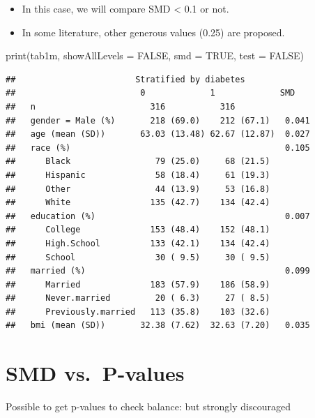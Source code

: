 \documentclass[
]{book}
\newenvironment{Shaded}{\begin{snugshade}}{\end{snugshade}}
\newcommand{\AttributeTok}[1]{\textcolor[rgb]{0.77,0.63,0.00}{#1}}
\newcommand{\ConstantTok}[1]{\textcolor[rgb]{0.00,0.00,0.00}{#1}}
\newcommand{\FunctionTok}[1]{\textcolor[rgb]{0.00,0.00,0.00}{#1}}
\newcommand{\NormalTok}[1]{#1}
\providecommand{\tightlist}{%
  \setlength{\itemsep}{0pt}\setlength{\parskip}{0pt}}
\begin{document}
\begin{itemize}
\tightlist
\item
  In this case, we will compare SMD \textless{} 0.1 or not.
\item
  In some literature, other generous values (0.25) are proposed. \citep{austin2011introduction}
\end{itemize}

\begin{Shaded}
\begin{Highlighting}[]
\FunctionTok{print}\NormalTok{(tab1m, }\AttributeTok{showAllLevels =} \ConstantTok{FALSE}\NormalTok{, }\AttributeTok{smd =} \ConstantTok{TRUE}\NormalTok{, }\AttributeTok{test =} \ConstantTok{FALSE}\NormalTok{) }
\end{Highlighting}
\end{Shaded}

\begin{verbatim}
##                        Stratified by diabetes
##                         0             1             SMD   
##   n                       316           316               
##   gender = Male (%)       218 (69.0)    212 (67.1)   0.041
##   age (mean (SD))       63.03 (13.48) 62.67 (12.87)  0.027
##   race (%)                                           0.105
##      Black                 79 (25.0)     68 (21.5)        
##      Hispanic              58 (18.4)     61 (19.3)        
##      Other                 44 (13.9)     53 (16.8)        
##      White                135 (42.7)    134 (42.4)        
##   education (%)                                      0.007
##      College              153 (48.4)    152 (48.1)        
##      High.School          133 (42.1)    134 (42.4)        
##      School                30 ( 9.5)     30 ( 9.5)        
##   married (%)                                        0.099
##      Married              183 (57.9)    186 (58.9)        
##      Never.married         20 ( 6.3)     27 ( 8.5)        
##      Previously.married   113 (35.8)    103 (32.6)        
##   bmi (mean (SD))       32.38 (7.62)  32.63 (7.20)   0.035
\end{verbatim}

\hypertarget{smd-vs.-p-values}{%
\section{SMD vs.~P-values}\label{smd-vs.-p-values}}

Possible to get p-values to check balance: but strongly discouraged
\end{document}
